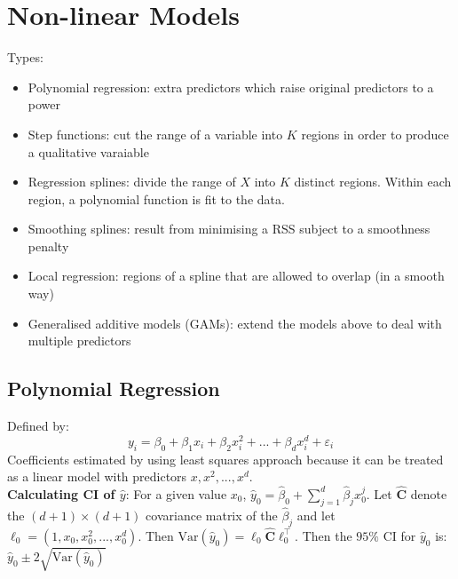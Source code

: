 \documentclass[11pt]{article}
\begin{document}
\section{Non-linear Models}
\noindent Types:
\begin{itemize}
    \item Polynomial regression: extra predictors which raise original predictors to a power
    \item Step functions: cut the range of a variable into $K$ regions in order to produce a qualitative varaiable
    \item Regression splines: divide the range of $X$ into $K$ distinct regions. Within each region, a polynomial function is fit to the data.
    \item Smoothing splines: result from minimising a RSS subject to a smoothness penalty
    \item Local regression: regions of a spline that are allowed to overlap (in a smooth way)
    \item Generalised additive models (GAMs): extend the models above to deal with multiple predictors
\end{itemize}

\subsection{Polynomial Regression}
\noindent Defined by:
$$y_i = \beta_0 + \beta_1x_i + \beta_2x_i^2 + ... + \beta_dx_i^d + \varepsilon_i$$
\noindent Coefficients estimated by using least squares approach because it can be treated as a linear model with predictors $x, x^2,...,x^d$. \\

\noindent \textbf{Calculating CI of $\hat y$}: For a given value $x_0$, $\hat{y}_0 = \hat{\beta}_0 + \sum_{j=1}^{d}{\hat{\beta}_j x_0^j}$. Let $\hat{\boldsymbol{C}}$ denote the $(d+1) \times (d+1)$ covariance matrix of the $\hat\beta_j$ and let $\ell_0 = (1,x_0,x_0^2,...,x_0^d)$. Then $\text{Var}(\hat{y}_0) = \ell_0\hat{\boldsymbol{C}}\ell_0^\top$. Then the $95\%$ CI for $\hat y_0$ is: $\hat{y}_0 \pm 2\sqrt{\text{Var}(\hat y _0)}$
\end{document}
